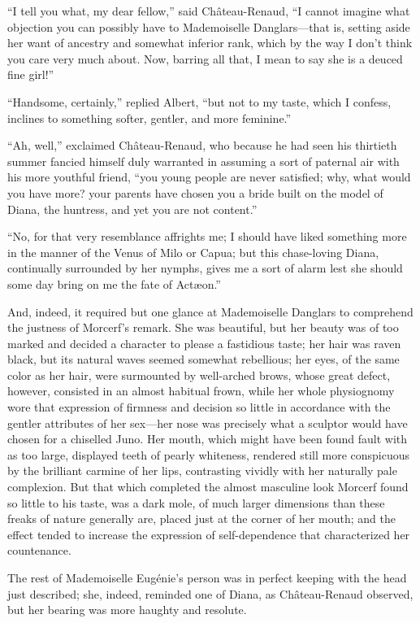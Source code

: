 “I tell you what, my dear fellow,” said Château-Renaud, “I cannot
imagine what objection you can possibly have to Mademoiselle
Danglars—that is, setting aside her want of ancestry and somewhat
inferior rank, which by the way I don’t think you care very much about.
Now, barring all that, I mean to say she is a deuced fine girl!”

“Handsome, certainly,” replied Albert, “but not to my taste, which I
confess, inclines to something softer, gentler, and more feminine.”

“Ah, well,” exclaimed Château-Renaud, who because he had seen his
thirtieth summer fancied himself duly warranted in assuming a sort of
paternal air with his more youthful friend, “you young people are never
satisfied; why, what would you have more? your parents have chosen you
a bride built on the model of Diana, the huntress, and yet you are not
content.”

“No, for that very resemblance affrights me; I should have liked
something more in the manner of the Venus of Milo or Capua; but this
chase-loving Diana, continually surrounded by her nymphs, gives me a
sort of alarm lest she should some day bring on me the fate of Actæon.”

And, indeed, it required but one glance at Mademoiselle Danglars to
comprehend the justness of Morcerf’s remark. She was beautiful, but her
beauty was of too marked and decided a character to please a fastidious
taste; her hair was raven black, but its natural waves seemed somewhat
rebellious; her eyes, of the same color as her hair, were surmounted by
well-arched brows, whose great defect, however, consisted in an almost
habitual frown, while her whole physiognomy wore that expression of
firmness and decision so little in accordance with the gentler
attributes of her sex—her nose was precisely what a sculptor would have
chosen for a chiselled Juno. Her mouth, which might have been found
fault with as too large, displayed teeth of pearly whiteness, rendered
still more conspicuous by the brilliant carmine of her lips,
contrasting vividly with her naturally pale complexion. But that which
completed the almost masculine look Morcerf found so little to his
taste, was a dark mole, of much larger dimensions than these freaks of
nature generally are, placed just at the corner of her mouth; and the
effect tended to increase the expression of self-dependence that
characterized her countenance.

The rest of Mademoiselle Eugénie’s person was in perfect keeping with
the head just described; she, indeed, reminded one of Diana, as
Château-Renaud observed, but her bearing was more haughty and resolute.

